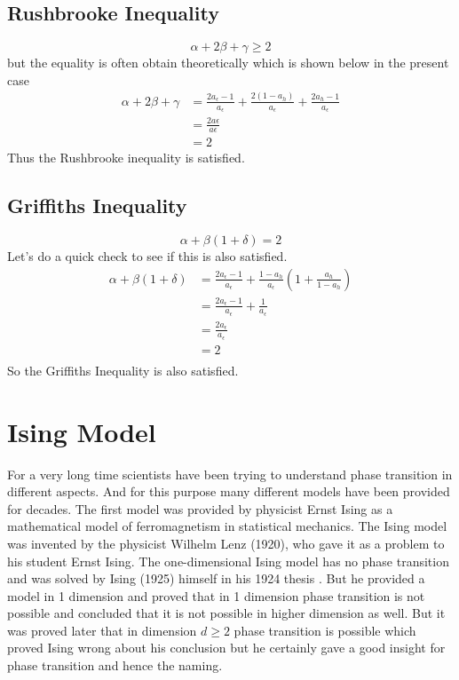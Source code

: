 	\subsection{Rushbrooke Inequality}
		\begin{equation}
			\alpha + 2 \beta + \gamma \ge 2
		\end{equation}
		but the equality is often obtain theoretically which is shown below in the present case 
		\begin{align}
			\alpha + 2\beta + \gamma &= \frac{2 a_\epsilon -1}{a_\epsilon} 
					+ \frac{2 (1 - a_h)}{a_\epsilon}
					+ \frac{2 a_h - 1}{a_\epsilon} \nonumber \\
					&= \frac{2 a\epsilon}{a\epsilon} \nonumber \\
					&= 2 \nonumber
		\end{align}
	Thus the Rushbrooke inequality is satisfied.
	\subsection{Griffiths Inequality}
	\begin{equation}
		\alpha + \beta (1+\delta)  = 2
	\end{equation}
	Let's do a quick check to see if this is also satisfied.
	\begin{align}
		\alpha + \beta (1+\delta) &= \frac{2 a_\epsilon - 1}{a_\epsilon} 
									+ \frac{1 - a_h}{a_\epsilon} \left(1 + \frac{a_h}{1 - a_h}\right) \nonumber \\
								  &= \frac{2 a_\epsilon - 1}{a_\epsilon}  + \frac{1}{a_\epsilon} \nonumber \\
								  &= \frac{2 a_\epsilon}{a_\epsilon} \nonumber \\
								  &= 2 \nonumber \\
	\end{align}
	So the Griffiths Inequality is also satisfied. 
	
	
	
\section{Ising Model}
	For a very long time scientists have been trying to understand phase transition in different aspects. And for this purpose many different models have been provided for decades. The first model was provided by physicist Ernst Ising as a mathematical model of ferromagnetism in statistical mechanics. 
	The Ising model was invented by the physicist Wilhelm Lenz (1920), who gave it as a problem to his student Ernst Ising. The one-dimensional Ising model has no phase transition and was solved by Ising (1925) himself in his 1924 thesis \cite{Ising1925}.
	But he provided a model in 1 dimension and proved that in 1 dimension phase transition is not possible and concluded that it is not possible in higher dimension as well. But it was proved later that in dimension $d \geq 2$ phase transition is possible \cite{Yang1952, Montroll1963} which proved Ising wrong about his conclusion but he certainly gave a good insight for phase transition and hence the naming.
	
